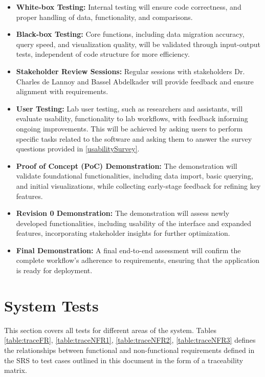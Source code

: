 \documentclass[12pt, titlepage]{article}
\begin{document}
\begin{itemize}
    \item \textbf{White-box Testing:} Internal testing will ensure code
    correctness, and proper handling of data, functionality, and comparisons.
    \item \textbf{Black-box Testing:} Core functions, including data migration
    accuracy, query speed, and visualization quality, will be validated through
    input-output tests, independent of code structure for more efficiency.
    \item \textbf{Stakeholder Review Sessions:} Regular sessions with
    stakeholders Dr. Charles de Lannoy and Bassel Abdelkader will provide
    feedback and ensure alignment with requirements.
    \item \textbf{User Testing:} Lab user testing, such as researchers and
    assistants, will evaluate usability, functionality to lab workflows, with
    feedback informing ongoing improvements. This will be achieved by asking
    users to perform specific tasks related to the software and asking them to
    answer the survey questions provided in \ref{usabilitySurvey}.
    \item \textbf{Proof of Concept (PoC) Demonstration:} The demonstration will
    validate foundational functionalities, including data import, basic
    querying, and initial visualizations, while collecting early-stage feedback
    for refining key features.
    \item \textbf{Revision 0 Demonstration:} The demonstration will assess newly
    developed functionalities, including usability of the interface and expanded
    features, incorporating stakeholder insights for further optimization.
    \item \textbf{Final Demonstration:} A final end-to-end assessment will
    confirm the complete workflow's adherence to requirements, ensuring that the
    application is ready for deployment.
\end{itemize}

\section{System Tests} \label{systemTests} This section covers all tests for
different areas of the system. Tables \ref{table:traceFR},
\ref{table:traceNFR1}, \ref{table:traceNFR2}, \ref{table:traceNFR3} defines the
relationships between functional and non-functional requirements defined in the
SRS to test cases outlined in this document in the form of a traceability
matrix.
\end{document}
